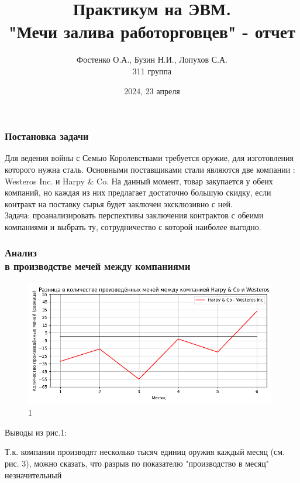 \documentclass[8pt]{beamer}
\title{Практикум на ЭВМ.\\ "Мечи залива работорговцев" - отчет}
\author{Фостенко О.А., Бузин Н.И., Лопухов С.А.\\ 311 группа}
\institute{МГУ имени М.В. Ломоносова, Москва, Россия}
\date{2024, 23 апреля}
\begin{document}
 
\frame{\titlepage}
 
\begin{frame}
\frametitle{Постановка задачи}
Для ведения войны с Семью Королевствами требуется оружие, для изготовления которого нужна сталь. Основными поставщиками стали являются две компании : {Westeros Inc.} и {Harpy \& Co}. На данный момент, товар закупается у обеих компаний, но каждая из них предлагает достаточно большую скидку, если контракт на поставку сырья будет заключен эксклюзивно с ней.\\

\bigskip
Задача: проанализировать перспективы заключения контрактов с обеими компаниями и выбрать ту, сотрудничество с которой наиболее выгодно.
\\
\end{frame}
 

\begin{frame}
\frametitle{Анализ\\{ в производстве мечей между компаниями}}
\begin{figure}[h]
		\includegraphics[width=110mm]{6-before-last.png}
		\caption{1}
		\label{First}
\end{figure}
\end{frame}

\begin{frame}
Выводы из рис.1:\\

\bigskip

Т.к. компании производят несколько тысяч единиц оружия каждый месяц (см. рис. 3), можно сказать, что разрыв по показателю "производство в месяц" незначительный\\ 

\bigskip
\\
\end{frame}
\end{document}
